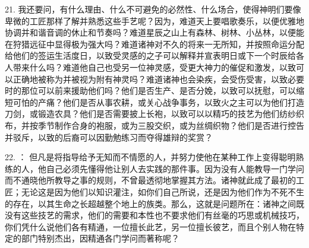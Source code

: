 21. 我还要问，有什么理由、什么不可避免的必然性、什么场合，使得神明们要像卑微的工匠那样了解并熟悉这些手艺呢？因为，难道天上要唱歌奏乐，以便优雅地协调并和谐音调的休止和节奏吗？难道星辰之山上有森林、树林、小丛林，以便能在狩猎远征中显得极为强大吗？难道诸神对不久的将来一无所知，并按照命运分配给他们的签运生活度日，以致受灵感的之子可以解释并宣表明日或下一个时辰给各人带来什么吗？难道他自己也受另一位神灵感，受更大神力的催促和激发，以致可以正确地被称为并被视为附有神灵吗？难道诸神也会染疾，会受伤受害，以致必要时的那位可以前来援助他们吗？他们是否生产、是否分娩，以致可以抚慰，可以缩短可怕的产痛？他们是否从事农耕，或关心战争事务，以致火之主可以为他们打造刀剑，或锻造农具？他们是否需要披上长袍，以致可以以精巧的技艺为他们纺纱织布，并按季节制作合身的袍服，或为三股交织，或为丝绸织物？他们是否进行控告并驳斥，以致的后裔可以因勤勉练习而夺得雄辩的奖赏？\par

22. ： 但凡是将指导给予无知而不情愿的人，并努力使他在某种工作上变得聪明熟练的人，他自己必须先懂得他让别人去实践的那件事。因为没有人能教导一门学问而不通晓他所教导之事的规则，不曾最透彻地掌握其方法。诸神就此成了最初的工匠；无论这是因为他们以知识灌注，如你们自己所说，还是因为他们作为不死不生的存在，以其生命之长超越整个地上的族类。那么，这就是问题所在：诸神之间既没有这些技艺的需求，他们的需要和本性也不要求他们有丝毫的巧思或机械技巧，你们凭什么说他们各有精通，一位擅长此艺，另一位擅长彼艺，而且个别人物在特定的部门特别杰出，因精通各门学问而著称呢？\par

